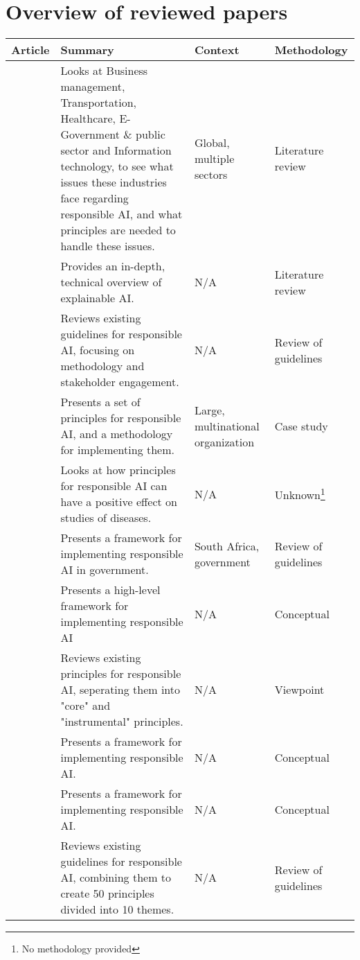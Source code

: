\section{Overview of reviewed papers}
\label{app:overview}
\begin{table}[!ht]
    \centering
    \begin{tabular}{lp{}lp{}}
    \toprule
        Article & Summary & Context & Methodology \\
    \midrule
        \textcite{Anagnostou_2022} & Looks at Business management, Transportation, Healthcare, E-Government \& public sector and Information technology, to see what issues these industries face regarding responsible AI, and what principles are needed to handle these issues.  & Global, multiple sectors & Literature review \\ 
        \textcite{Barredo_2020} & Provides an in-depth, technical overview of explainable AI. & N/A & Literature review \\ 
        \textcite{Bélisle-Pipon_2022} & Reviews existing guidelines for responsible AI, focusing on methodology and stakeholder engagement. & N/A & Review of guidelines \\ 
        \textcite{Benjamins_2019} & Presents a set of principles for responsible AI, and a methodology for implementing them. & Large, multinational organization & Case study \\ 
        \textcite{Borda_2022} & Looks at how principles for responsible AI can have a positive effect on studies of diseases. & N/A & Unknown\footnote{No methodology provided} \\ 
        \textcite{Brand_2022} & Presents a framework for implementing responsible AI in government. & South Africa, government & Review of guidelines \\ 
        \textcite{Buhmann_2021} & Presents a high-level framework for implementing responsible AI & N/A & Conceptual \\ 
        \textcite{Canca_2020} & Reviews existing principles for responsible AI, seperating them into "core" and "instrumental" principles. & N/A & Viewpoint \\ 
        \textcite{Chen_2020} & Presents a framework for implementing responsible AI. & N/A & Conceptual \\ 
        \textcite{Cheng_2021} & Presents a framework for implementing responsible AI. & N/A & Conceptual \\ 
        \textcite{Clarke_2019} & Reviews existing guidelines for responsible AI, combining them to create 50 principles divided into 10 themes. & N/A & Review of guidelines \\ 

\end{tabular}
\end{table}
